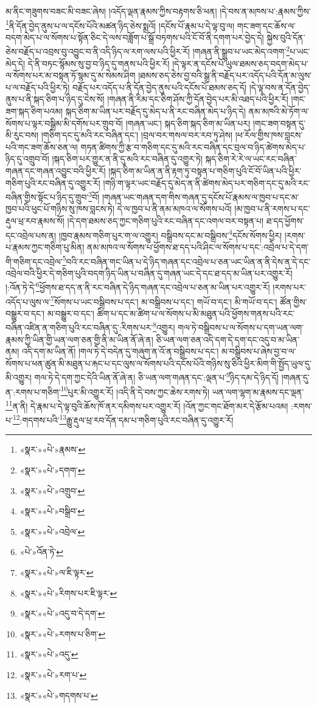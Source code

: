 མ་ནིང་གཟུགས་བཟང་མི་བཟང་ཞེས། །འདོད་ལྡན་རྣམས་ཀྱིས་བརྟགས་ཅི་ཕན། །དེ་བས་ན་མཁས་པ་:རྣམས་ཀྱིས་\footnote{«སྣར་»«པེ་»རྣམས་}ནི་དོན་བྱེད་ནུས་པ་ལ་དངོས་པོའི་མཚན་ཉིད་ཅེས་སྨྲའོ། །དངོས་པོ་རྣམ་པ་དེ་ལྟ་བུ་ལ། གང་ཟག་དང་ཆོས་ལ་བདག་མེད་པ་ལ་སོགས་པ་སྟོན་ཅིང་དེ་ལས་བཟློག་པ་སྒྲོ་བཏགས་པའི་ངོ་བོ་ནི་དགག་པར་བྱེད་དེ། སྐྱེས་བུའི་དོན་ཅེས་བརྗོད་པ་འབྲས་བུ་འབྱུང་བ་ནི་འདི་ཉིད་ལ་རག་ལས་པའི་ཕྱིར་རོ། །གཞན་ནི་སྒྲུབ་པ་ཡང་མེད་འགག་\footnote{«སྣར་»«པེ་»དགག་}པ་ཡང་མེད་དེ། དེ་ནི་བཏང་སྙོམས་སུ་བྱ་བ་ཉིད་དུ་གནས་པའི་ཕྱིར་རོ། །དེ་ལྟར་ན་དངོས་པོ་ཡུལ་ཐམས་ཅད་བདག་མེད་པ་ལ་སོགས་པར་མ་བསྟན་ཏོ་སྙམ་དུ་མ་སེམས་ཤིག །ཐམས་ཅད་ཅེས་བྱ་བའི་སྒྲ་ནི་བརྗོད་པར་འདོད་པའི་དོན་མ་ལུས་པ་ལ་བརྗོད་པའི་ཕྱིར་ཏེ། བརྗོད་པར་འདོད་པ་ནི་དོན་བྱེད་ནུས་པའི་དངོས་པོ་ཐམས་ཅད་དོ། །དེ་ལྟ་བས་ན་དོན་བྱེད་ནུས་པ་ནི་སྐད་ཅིག་པ་ཉིད་དུ་ངེས་སོ། །གཞན་ནི་རིམ་དང་ཅིག་ཤོས་ཀྱི་དོན་བྱེད་པར་མི་འཐད་པའི་ཕྱིར་རོ། །གང་ཟག་སྐད་ཅིག་པའམ། སྐད་ཅིག་མ་ཡིན་པར་བརྗོད་དུ་མེད་པ་ནི་རང་བཞིན་མེད་པ་ཉིད་དེ། ནམ་མཁའི་མེ་ཏོག་ལ་སོགས་པ་ལྟར་བསྒྲིམ་མི་དགོས་པར་གྲུབ་བོ། །གཞན་ཡང་། སྐད་ཅིག་སྐད་ཅིག་མ་ཡིན་པར། །གང་ཟག་བསྟན་དུ་མི་རུང་བས། །གཅིག་དང་དུ་མའི་རང་བཞིན་དང་། །བྲལ་བར་གསལ་བར་རབ་ཏུ་ཤེས། །ཕ་རོལ་གྱིས་ཁས་བླངས་པའི་གང་ཟག་ཆོས་ཅན་ལ། གཏན་ཚིགས་ཀྱི་རྩ་བ་གཅིག་དང་དུ་མའི་རང་བཞིན་དང་བྲལ་བ་ཉིད་ཚེགས་མེད་པ་ཉིད་དུ་འགྲུབ་བོ། །སྐད་ཅིག་པར་གྱུར་ན་ནི་དུ་མའི་རང་བཞིན་དུ་འགྱུར་ཏེ། སྐད་ཅིག་རེ་རེ་ལ་ཡང་རང་བཞིན་གཞན་དང་གཞན་འབྱུང་བའི་ཕྱིར་རོ། །སྐད་ཅིག་མ་ཡིན་ན་ནི་རྟག་ཏུ་བསྟན་པ་གཅིག་པུའི་ངོ་བོ་ཡིན་པའི་ཕྱིར་གཅིག་པུའི་རང་བཞིན་དུ་འགྱུར་རོ། །གཉི་ག་ལྟར་ཡང་བརྗོད་དུ་མེད་ན་ནི་ཚེགས་མེད་པར་གཅིག་དང་དུ་མའི་རང་བཞིན་གྱིས་སྟོང་པ་ཉིད་དུ་གྲུབ་\footnote{«སྣར་»«པེ་»འགྲུབ་}བོ། །གཞན་ཡང་གཞན་དག་གིས་གཞན་དུ་དངོས་པོ་རྣམས་ལ་ཁྱབ་པ་དང་མ་ཁྱབ་པའི་ཕུང་པོ་གཉིས་སུ་ཁས་བླངས་ཏེ། དེ་ལ་ཁྱབ་པ་ནི་ནམ་མཁའ་ལ་སོགས་པའོ། །མ་ཁྱབ་པ་ནི་རགས་པ་དང་རྡུལ་ཕྲ་རབ་རྣམས་སོ། །དེ་དག་ཐམས་ཅད་ཀྱང་གཅིག་པུའི་རང་བཞིན་དང་འགལ་བར་བསྟན་པ། ཐ་དད་ཕྱོགས་དང་འབྲེལ་པས་ན། །ཁྱབ་རྣམས་གཅིག་པུར་ག་ལ་འགྱུར། བསྒྲིབས་དང་མ་བསྒྲིབས་\footnote{«སྣར་»«པེ་»བསྒྲིབ་}དངོས་སོགས་ཕྱིར། །རགས་པ་རྣམས་ཀྱང་གཅིག་པུ་མིན། ནམ་མཁའ་ལ་སོགས་པ་ཕྱོགས་ཐ་དད་པའི་ཤིང་ལ་སོགས་པ་དང་:འབྲེལ་པ་དེ་དག་གི་གཅིག་དང་འབྲེལ་\footnote{«སྣར་»«པེ་»འབྲེལ་}བའི་རང་བཞིན་གང་ཡིན་པ་དེ་ཉིད་གཞན་དང་འབྲེལ་པ་ཅན་ཡང་ཡིན་ན་ནི་དེས་ན་དེ་དང་འབྲེལ་བའི་ཕྱིར་དེ་གཅིག་པུའི་བདག་ཉིད་ཡིན་པ་བཞིན་དུ་གཞན་ཡང་དེ་དང་ཐ་དད་མ་ཡིན་པར་འགྱུར་རོ། །:འོན་ཏེ་དེ་\footnote{«པེ་»འོན་ཏེ་}ཕྱོགས་ཐ་དད་ན་ནི་རང་བཞིན་དེ་ཉིད་གཞན་དང་འབྲེལ་པ་ཅན་མ་ཡིན་པར་འགྱུར་རོ། །རགས་པར་འདོད་པ་ལུས་ལ་\footnote{«སྣར་»«པེ་»ལ་ཇི་ལྟར་}སོགས་པ་ཡང་བསྒྲིབས་པ་དང་། མ་བསྒྲིབས་པ་དང་། གཡོ་བ་དང་། མི་གཡོ་བ་དང་། ཚོན་གྱིས་བསྒྱུར་བ་དང་། མ་བསྒྱུར་བ་དང་། ཚིག་པ་དང་མ་ཚིག་པ་ལ་སོགས་པ་མི་མཐུན་པའི་ཕྱོགས་གནས་པའི་རང་བཞིན་འཛིན་ན་གཅིག་པུའི་རང་བཞིན་དུ་:རིགས་པར་\footnote{«སྣར་»«པེ་»རིགས་པར་ཇི་ལྟར་}འགྱུར། གལ་ཏེ་བསྒྲིབས་པ་ལ་སོགས་པ་དག་ཡན་ལག་རྣམས་ཀྱི་ཡིན་གྱི་ཡན་ལག་ཅན་གྱི་ནི་མ་ཡིན་ནོ་ཞེ་ན། ཅི་ཡན་ལག་ཅན་འདི་དག་དེ་དག་དང་འདུ་བ་མ་ཡིན་ནམ། འདི་དག་མ་ཡིན་ནོ། །གལ་ཏེ་དེ་བདེན་དུ་གཞུག་ན་འོ་ན་བསྒྲིབས་པ་དང་། མ་བསྒྲིབས་པ་ཞེས་བྱ་བ་ལ་སོགས་པ་ཕན་ཚུན་མི་མཐུན་པ་རྐང་པ་དང་ལུས་ལ་སོགས་པའི་དངོས་པོའི་གཉིས་སུ་ཅིའི་ཕྱིར་མིག་གི་སྤྱོད་ཡུལ་དུ་མི་འགྱུར། གལ་ཏེ་དེ་དག་ཀྱང་དེའི་ཡིན་ནོ་ཞེ་ན། ཅི་ཡན་ལག་གཞན་དང་:ལྡན་པ་\footnote{«སྣར་»«པེ་»འདུ་བ་དེ་དག་}ཉིད་དམ་དེ་ཉིད་དོ། །གཞན་དུ་ན་:རགས་པ་གཅིག་\footnote{«སྣར་»«པེ་»རགས་པ་ཅིག་}པུར་མི་འགྱུར་རོ། །འདི་ནི་དེ་བས་ཀྱང་ཆེས་རགས་ཏེ། ཡན་ལག་ལྷག་མ་རྣམས་དང་ལྡན་\footnote{«སྣར་»«པེ་»འདུ་}ན་ནི། དེ་རྣམ་པ་དེ་ལྟ་བུའི་ཆོས་ཁོ་ནར་དམིགས་པར་འགྱུར་རོ། །འོན་ཀྱང་གང་ཐོག་མར་དེ་རྩོམ་པའམ། :རགས་པ་\footnote{«སྣར་»«པེ་»རག་པ་}:གདགས་པའི་\footnote{«སྣར་»«པེ་»གདགས་པ་}རྒྱུ་རྡུལ་ཕྲ་རབ་དོན་དམ་པ་གཅིག་པུའི་རང་བཞིན་དུ་འགྱུར་རོ། 